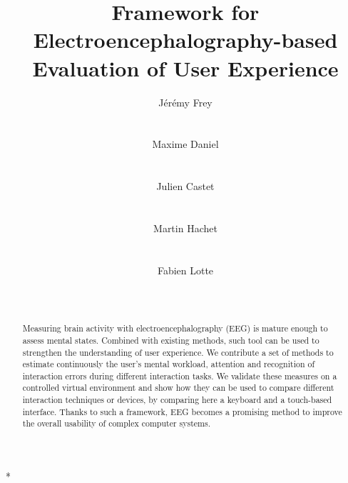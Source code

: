 \documentclass[]{sigchi}
\title{Framework for Electroencephalography-based Evaluation of User Experience}
\author{
  \alignauthor Jérémy Frey\\
    \affaddr{Univ. Bordeaux, France}\\
    \email{jeremy.frey@inria.fr}\\
  \alignauthor Maxime Daniel\\
    \affaddr{Immersion SAS, France}\\
    \email{maxime.daniel@u-bordeaux.fr}\\ 
  \alignauthor Julien Castet\\
    \affaddr{Immersion SAS, France}\\
    \email{julien.castet@immersion.fr}\\ 
  \alignauthor Martin Hachet\\
    \affaddr{Inria, France}\\
    \email{martin.hachet@inria.fr}\\
  \alignauthor Fabien Lotte\\
    \affaddr{Inria, France}\\
    \email{fabien.lotte@inria.fr}\\
}
\date{}
\begin{document}
  
\maketitle
\begin{abstract}
Measuring brain activity with electroencephalography (EEG) is mature
enough to assess mental states. Combined with existing methods, such
tool can be used to strengthen the understanding of user experience. We
contribute a set of methods to estimate continuously the user's mental
workload, attention and recognition of interaction errors during
different interaction tasks. We validate these measures on a controlled
virtual environment and show how they can be used to compare different
interaction techniques or devices, by comparing here a keyboard and a
touch-based interface. Thanks to such a framework, EEG becomes a
promising method to improve the overall usability of complex computer
systems.
\end{abstract}


  

\def \citep {\protect\cite}





\makeatletter
\def\url@leostyle{\@ifundefined{selectfont}{\def\UrlFont{\sf}}{\def\UrlFont{\small\bf\ttfamily}}}
\makeatother
{}

\def\pprw{8.5in}
\def\pprh{11in}
\special{papersize=\pprw,\pprh}
\setlength{\paperwidth}{\pprw}
\setlength{\paperheight}{\pprh}
\setlength{\pdfpagewidth}{\pprw}
\setlength{\pdfpageheight}{\pprh}

\hypersetup{bookmarksnumbered,
  colorlinks,
  citecolor=black,
  filecolor=black,
  linkcolor=black,
  urlcolor=linkColor,
  breaklinks=true,
}

\WithSuffix\newcommand\caption*{\caption}
\end{document}
